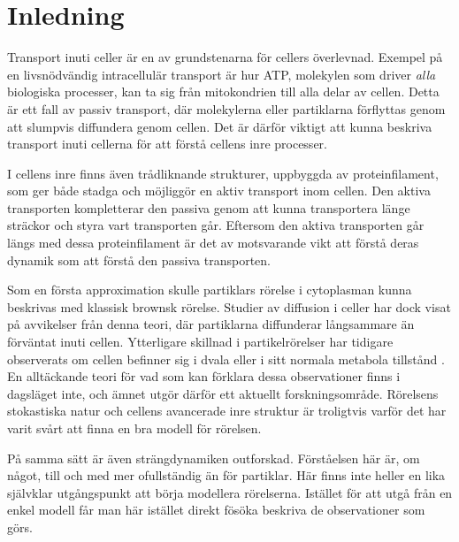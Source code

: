 \chapter{Inledning}



Transport inuti celler är en av grundstenarna för cellers överlevnad. Exempel på en livsnödvändig intracellulär transport är hur ATP, molekylen som driver \emph{alla} biologiska processer, kan ta sig från mitokondrien till alla delar av cellen. Detta är ett fall av passiv transport, där molekylerna eller partiklarna förflyttas genom att slumpvis diffundera genom cellen. Det är därför viktigt att kunna beskriva transport inuti cellerna för att förstå cellens inre processer.

I cellens inre finns även trådliknande strukturer, uppbyggda av proteinfilament, som ger både stadga och möjliggör en aktiv transport inom cellen. Den aktiva transporten kompletterar den passiva genom att kunna transportera länge sträckor och styra vart transporten går. Eftersom den aktiva transporten går längs med dessa proteinfilament är det av motsvarande vikt att förstå deras dynamik som att förstå den passiva transporten. 


Som en första approximation skulle partiklars rörelse i cytoplasman kunna beskrivas med klassisk brownsk rörelse. Studier av diffusion i celler \cite{Hofling&Franosch2013,Dix_Crowdingeffects2008,Gou_etal2014,Parry_etal2014} har dock visat på avvikelser från denna teori, där partiklarna diffunderar långsammare än förväntat inuti cellen. Ytterligare skillnad i partikelrörelser har tidigare observerats om cellen befinner sig i dvala eller i sitt normala metabola tillstånd \cite{Parry_etal2014,Midtveldt_etal2016}. En alltäckande teori för vad som kan förklara dessa observationer finns i dagsläget inte, och ämnet utgör därför ett aktuellt forskningsområde. Rörelsens stokastiska natur och cellens avancerade inre struktur är troligtvis varför det har varit svårt att finna en bra modell för rörelsen. 

På samma sätt är även strängdynamiken outforskad. Förståelsen här är, om något, till och med mer ofullständig än för partiklar\cite{Koster_etal2005,Koster_etal2007,Koster_etal2008}. Här finns inte heller en lika självklar utgångspunkt att börja modellera rörelserna. Istället för att utgå från en enkel modell får man här istället direkt fösöka beskriva de observationer som görs.

